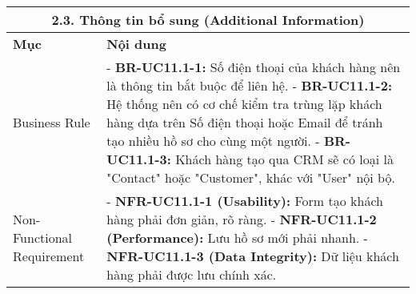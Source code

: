 \begin{longtable}{|m{4cm}|p{11cm}|}
\hline
\multicolumn{2}{|c|}{\textbf{2.3. Thông tin bổ sung (Additional Information)}} \\
\hline
\textbf{Mục} & \textbf{Nội dung} \\
\hline
Business Rule & - \textbf{BR-UC11.1-1:} Số điện thoại của khách hàng nên là thông tin bắt buộc để liên hệ. \newline - \textbf{BR-UC11.1-2:} Hệ thống nên có cơ chế kiểm tra trùng lặp khách hàng dựa trên Số điện thoại hoặc Email để tránh tạo nhiều hồ sơ cho cùng một người. \newline - \textbf{BR-UC11.1-3:} Khách hàng tạo qua CRM sẽ có loại là "Contact" hoặc "Customer", khác với "User" nội bộ. \\
\hline
Non-Functional Requirement & - \textbf{NFR-UC11.1-1 (Usability):} Form tạo khách hàng phải đơn giản, rõ ràng. \newline - \textbf{NFR-UC11.1-2 (Performance):} Lưu hồ sơ mới phải nhanh. \newline - \textbf{NFR-UC11.1-3 (Data Integrity):} Dữ liệu khách hàng phải được lưu chính xác. \\
\hline
\end{longtable}

